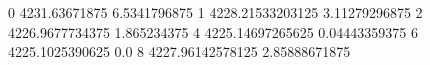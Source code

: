 0 4231.63671875 6.5341796875
1 4228.21533203125 3.11279296875
2 4226.9677734375 1.865234375
4 4225.14697265625 0.04443359375
6 4225.1025390625 0.0
8 4227.96142578125 2.85888671875
